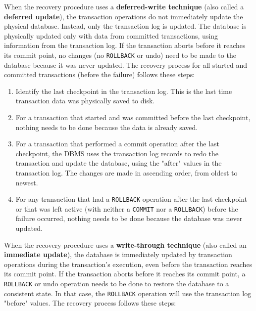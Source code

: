 \documentclass[a4paper, 11pt, titlepage]{report}
\begin{document}
When the recovery procedure uses a \textbf{deferred-write technique} (also called a \textbf{deferred update}), the transaction operations do not immediately update the physical database. Instead, only the transaction log is updated. The database is physically updated only with data from committed transactions, using information from the transaction log. If the transaction aborts before it reaches its commit point, no changes (no \texttt{ROLLBACK} or undo) need to be made to the database because it was never updated. The recovery process for all started and committed transactions (before the failure) follows these steps:
\begin{enumerate}
\item Identify the last checkpoint in the transaction log. This is the last time transaction data was physically saved to disk.
\item For a transaction that started and was committed before the last checkpoint, nothing needs to be done because the data is already saved.
\item For a transaction that performed a commit operation after the last checkpoint, the DBMS uses the transaction log records to redo the transaction and update the database, using the "after" values in the transaction log. The changes are made in ascending order, from oldest to newest.
\item For any transaction that had a \texttt{ROLLBACK} operation after the last checkpoint or
that was left active (with neither a \texttt{COMMIT} nor a \texttt{ROLLBACK}) before the failure
occurred, nothing needs to be done because the database was never updated.
\end{enumerate}
When the recovery procedure uses a \textbf{write-through technique} (also called an
\textbf{immediate update}), the database is immediately updated by transaction operations during
the transaction's execution, even before the transaction reaches its commit point. If the transaction aborts before it reaches its commit point, a \texttt{ROLLBACK} or undo operation needs to
be done to restore the database to a consistent state. In that case, the \texttt{ROLLBACK} operation
will use the transaction log "before" values. The recovery process follows these steps:
\end{document}
